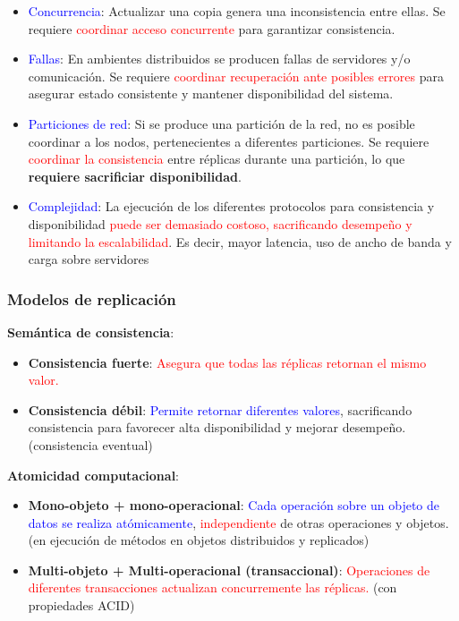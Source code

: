 \begin{itemize}
    \item \textcolor{blue}{Concurrencia}: Actualizar una copia genera una inconsistencia entre ellas. Se requiere \textcolor{red}{coordinar acceso concurrente} para garantizar consistencia.
    \item \textcolor{blue}{Fallas}: En ambientes distribuidos se producen fallas de servidores y/o comunicación. Se requiere \textcolor{red}{coordinar recuperación ante posibles errores} para asegurar estado consistente y mantener disponibilidad del sistema.
    \item \textcolor{blue}{Particiones de red}: Si se produce una partición de la red, no es posible coordinar a los nodos, pertenecientes a diferentes particiones. Se requiere \textcolor{red}{coordinar la consistencia} entre réplicas durante una partición, lo que \textbf{requiere sacrificiar disponibilidad}.
    \item \textcolor{blue}{Complejidad}: La ejecución de los diferentes protocolos para consistencia y disponibilidad \textcolor{red}{puede ser demasiado costoso, sacrificando desempeño y limitando la escalabilidad}. Es decir, mayor latencia, uso de ancho de banda y carga sobre servidores
\end{itemize}

\subsubsection{Modelos de replicación}

\textbf{Semántica de consistencia}: 

\begin{itemize}
    \item \textbf{Consistencia fuerte}: \textcolor{red}{Asegura que todas las réplicas retornan el mismo valor.}
    \item \textbf{Consistencia débil}: \textcolor{blue}{Permite retornar diferentes valores}, sacrificando consistencia para favorecer alta disponibilidad y mejorar desempeño. (consistencia eventual)
\end{itemize}

\textbf{Atomicidad computacional}: 

\begin{itemize}
    \item \textbf{Mono-objeto + mono-operacional}: \textcolor{blue}{Cada operación sobre un objeto de datos se realiza atómicamente}, \textcolor{red}{independiente} de otras operaciones y objetos. (en ejecución de métodos en objetos distribuidos y replicados)
    \item \textbf{Multi-objeto + Multi-operacional (transaccional)}: \textcolor{red}{Operaciones de diferentes transacciones actualizan concurremente las réplicas.} (con propiedades ACID)
\end{itemize}

